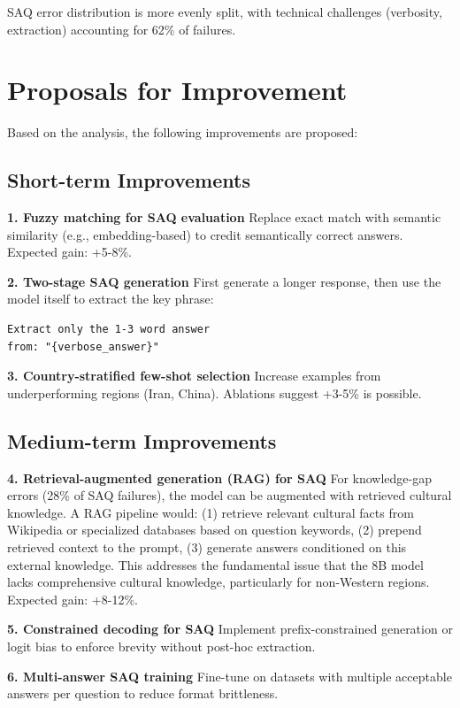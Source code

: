 \documentclass[11pt,a4paper,twocolumn]{article}
\begin{document}
SAQ error distribution is more evenly split, with technical challenges (verbosity, extraction) accounting for 62\% of failures.

\section{Proposals for Improvement}

Based on the analysis, the following improvements are proposed:

\subsection{Short-term Improvements}

\textbf{1. Fuzzy matching for SAQ evaluation}
Replace exact match with semantic similarity (e.g., embedding-based) to credit semantically correct answers. Expected gain: +5-8\%.

\textbf{2. Two-stage SAQ generation}
First generate a longer response, then use the model itself to extract the key phrase:
\begin{verbatim}
Extract only the 1-3 word answer 
from: "{verbose_answer}"
\end{verbatim}

\textbf{3. Country-stratified few-shot selection}
Increase examples from underperforming regions (Iran, China). Ablations suggest +3-5\% is possible.

\subsection{Medium-term Improvements}

\textbf{4. Retrieval-augmented generation (RAG) for SAQ}
For knowledge-gap errors (28\% of SAQ failures), the model can be augmented with retrieved cultural knowledge. A RAG pipeline would: (1) retrieve relevant cultural facts from Wikipedia or specialized databases based on question keywords, (2) prepend retrieved context to the prompt, (3) generate answers conditioned on this external knowledge. This addresses the fundamental issue that the 8B model lacks comprehensive cultural knowledge, particularly for non-Western regions. Expected gain: +8-12\%.

\textbf{5. Constrained decoding for SAQ}
Implement prefix-constrained generation or logit bias to enforce brevity without post-hoc extraction.

\textbf{6. Multi-answer SAQ training}
Fine-tune on datasets with multiple acceptable answers per question to reduce format brittleness.
\end{document}
